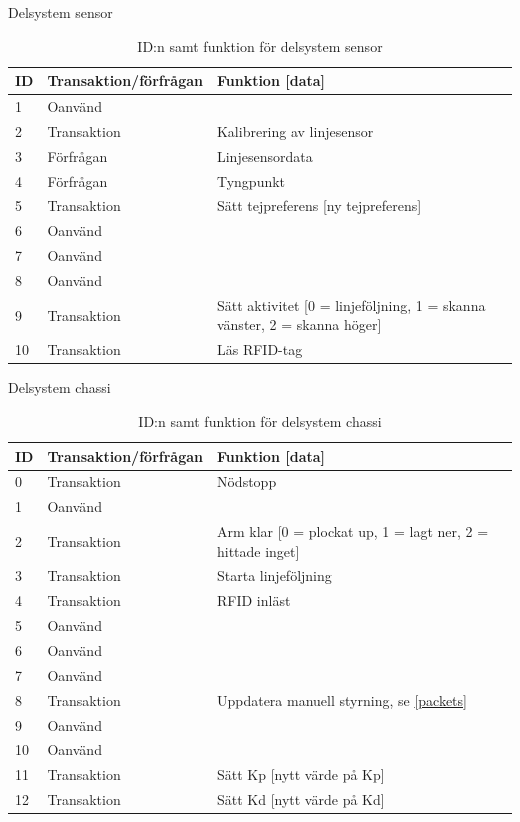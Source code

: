 \begin{table}[H]
\centering
\label{callbacks-sensor}
Delsystem sensor
\begin{tabularx}{\textwidth}{|l|l|X|}
\hline
\textbf{ID} & \textbf{Transaktion/förfrågan} & \textbf{Funktion [data]} \\ \hline
1 & Oanvänd & \\ \hline
2 & Transaktion & Kalibrering av linjesensor \\ \hline
3 & Förfrågan & Linjesensordata \\ \hline
4 & Förfrågan & Tyngpunkt \\ \hline
5 & Transaktion & Sätt tejpreferens [ny tejpreferens] \\ \hline
6 & Oanvänd & \\ \hline
7 & Oanvänd & \\ \hline
8 & Oanvänd & \\ \hline
9 & Transaktion & Sätt aktivitet [0 = linjeföljning, 1 = skanna vänster, 2 = skanna höger] \\ \hline
10 & Transaktion & Läs RFID-tag \\ \hline
\end{tabularx}
\caption{ID:n samt funktion för delsystem sensor}
\end{table}

Delsystem chassi

\begin{table}[H]
\centering
\label{callbacks-chassi}
\begin{tabularx}{\textwidth}{|l|l|X|}
\hline
\textbf{ID} & \textbf{Transaktion/förfrågan} & \textbf{Funktion [data]} \\ \hline
0 & Transaktion & Nödstopp \\ \hline
1 & Oanvänd & \\ \hline
2 & Transaktion & Arm klar [0 = plockat up, 1 = lagt ner, 2 = hittade inget] \\ \hline
3 & Transaktion & Starta linjeföljning \\ \hline
4 & Transaktion & RFID inläst \\ \hline
5 & Oanvänd & \\ \hline
6 & Oanvänd & \\ \hline
7 & Oanvänd & \\ \hline
8 & Transaktion & Uppdatera manuell styrning, se \ref{packets}\\ \hline
9 & Oanvänd & \\ \hline
10 & Oanvänd & \\ \hline
11 & Transaktion & Sätt Kp [nytt värde på Kp] \\ \hline
12 & Transaktion & Sätt Kd [nytt värde på Kd] \\ \hline
\end{tabularx}
\caption{ID:n samt funktion för delsystem chassi}
\end{table}

